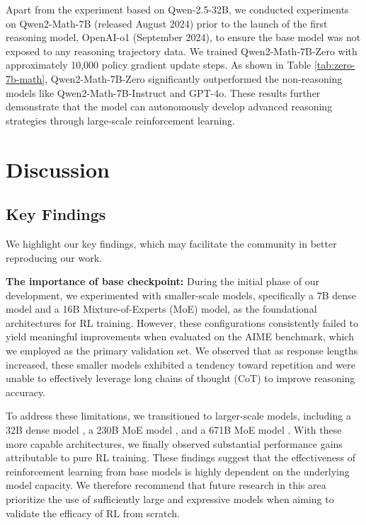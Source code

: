 
Apart from the experiment based on Qwen-2.5-32B, we conducted experiments on Qwen2-Math-7B (released August 2024) prior to the launch of the first reasoning model, OpenAI-o1 (September 2024), to ensure the base model was not exposed to any reasoning trajectory data. 
We trained Qwen2-Math-7B-Zero with approximately 10,000 policy gradient update steps. As shown in Table \ref{tab:zero-7b-math}, Qwen2-Math-7B-Zero significantly outperformed the non-reasoning models like Qwen2-Math-7B-Instruct and GPT-4o. These results further demonstrate that the model can autonomously develop advanced reasoning strategies through large-scale reinforcement learning.

\section{Discussion}
\subsection{Key Findings}
We highlight our key findings, which may facilitate the community in better reproducing our work.

\textbf{The importance of base checkpoint: } During the initial phase of our development, we experimented with smaller-scale models, specifically a 7B dense model and a 16B Mixture-of-Experts (MoE) model, as the foundational architectures for RL training. However, these configurations consistently failed to yield meaningful improvements when evaluated on the AIME benchmark, which we employed as the primary validation set. We observed that as response lengths increased, these smaller models exhibited a tendency toward repetition and were unable to effectively leverage long chains of thought (CoT) to improve reasoning accuracy.

To address these limitations, we transitioned to larger-scale models, including a 32B dense model \citep{qwen2_5}, a 230B MoE model \citep{dsvii}, and a 671B MoE model \citep{dsviii}. With these more capable architectures, we finally observed substantial performance gains attributable to pure RL training. These findings suggest that the effectiveness of reinforcement learning from base models is highly dependent on the underlying model capacity. We therefore recommend that future research in this area prioritize the use of sufficiently large and expressive models when aiming to validate the efficacy of RL from scratch.

